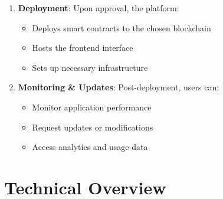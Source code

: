 \documentclass[12pt,a4paper]{article}
\begin{document}
\begin{enumerate}
    \item \textbf{Deployment}: Upon approval, the platform:
    \begin{itemize}
        \item Deploys smart contracts to the chosen blockchain
        \item Hosts the frontend interface
        \item Sets up necessary infrastructure
    \end{itemize}
    
    \item \textbf{Monitoring \& Updates}: Post-deployment, users can:
    \begin{itemize}
        \item Monitor application performance
        \item Request updates or modifications
        \item Access analytics and usage data
    \end{itemize}
\end{enumerate}










\section{Technical Overview}
\label{sec:literature}
\end{document}
